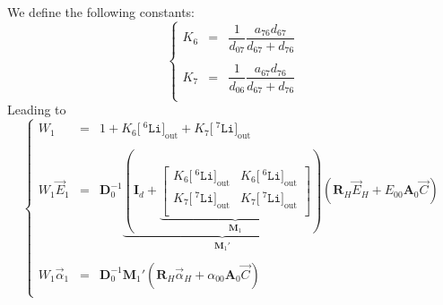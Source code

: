 \documentclass[aps,onecolumn,11pt]{revtex4}
\newcommand{\mychem}[1]{\mathtt{#1}}
\newcommand{\myconc}[1]{\big[#1\big]}
\newcommand{\spLi}[1]{{\!~^{#1}\mychem{Li}}}
\newcommand{\Li}[1]{\myconc{\spLi{#1}}}
\newcommand{\myout}[1]{{#1}_{\mathrm{out}}}
\newcommand{\LiOut}[1]{\myout{\Li{#1}}}
\newcommand{\mymat}[1]{{\bm{#1}}}
\begin{document}
We define the following constants:
\begin{equation}
\left\lbrace
\begin{array}{rcl}
K_6 & = & \dfrac{1}{d_{07}}  \dfrac{a_{76}d_{67}}{d_{67}+d_{76}} \\
\\
K_7 & = &  \dfrac{1}{d_{06}} \dfrac{a_{67}d_{76}}{d_{67}+d_{76}} \\
\end{array}
\right.
\end{equation}
Leading to
\begin{equation}
\left\lbrace
\begin{array}{rcl}
W_1 & = & 1 +    K_6\LiOut{6} +  K_7 \LiOut{7}  \\
\\
W_1 \vec{E}_1 & = & \mymat{D}_0^{-1}
\underbrace{
\left(
\mymat{I}_d+
\underbrace{
	\begin{bmatrix}
	K_6\LiOut{6} & K_6\LiOut{6}\\
	K_7\LiOut{7} & K_7 \LiOut{7}\\
	\end{bmatrix}
	}_{\mymat{M}_1}
		\right)}_{\mymat{M}_1'}
	\left( 
	\mymat{R}_H \vec{E}_H + E_{00} \mymat{A}_0 \vec{C}
	\right)
	\\
\\
W_1 \vec{\alpha}_1 & = & \mymat{D}_0^{-1} \mymat{M}_1' \left( \mymat{R}_H \vec{\alpha}_H + \alpha_{00} \mymat{A}_0 \vec{C} \right)\\
\end{array}
\right.
\end{equation}
\end{document}
